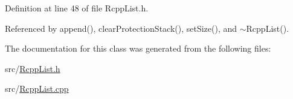 Definition at line 48 of file RcppList.h.

Referenced by append(), clearProtectionStack(), setSize(), and $\sim$RcppList().

The documentation for this class was generated from the following files:\begin{DoxyCompactItemize}
\item 
src/\hyperlink{RcppList_8h}{RcppList.h}\item 
src/\hyperlink{RcppList_8cpp}{RcppList.cpp}\end{DoxyCompactItemize}
